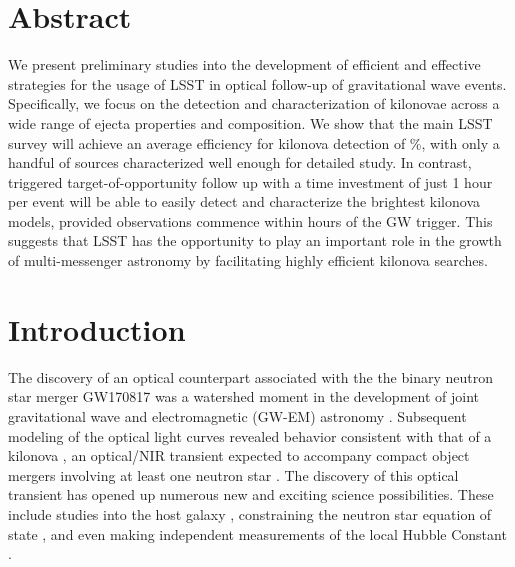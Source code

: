 \section*{Abstract}
We present preliminary studies into the development of efficient and effective strategies for the usage of LSST in optical follow-up of gravitational wave events. Specifically, we focus on the detection and characterization of kilonovae across a wide range of ejecta properties and composition. We show that the main LSST survey will achieve an average efficiency for kilonova detection of \%, with only a handful of sources characterized well enough for detailed study. In contrast, triggered target-of-opportunity follow up with a time investment of just 1 hour per event will be able to easily detect and characterize the brightest kilonova models, provided observations commence within  hours of the GW trigger. This suggests that LSST has the opportunity to play an important role in the growth of multi-messenger astronomy by facilitating highly efficient kilonova searches.

\clearpage
\section{Introduction}
\label{sec:ch6_intro}
The discovery of an optical counterpart associated with the the binary neutron star merger GW170817 was a watershed moment in the development of joint gravitational wave and electromagnetic (GW-EM) astronomy \citep{LIGOGW170817,LIGOMMAPaper,Arcavi+17,Coulter+17,GW170817DECam,Valenti+17}. Subsequent modeling of the optical light curves revealed behavior consistent with that of a kilonova \citep{Cowp+17,Kilpatrick+17,Tanaka+17,Villar+17b, Tanaka+18}, an optical/NIR transient expected to accompany compact object mergers involving at least one neutron star \citep[see e.g.,][]{Metzger2017}. The discovery of this optical transient has opened up numerous new and exciting science possibilities. These include studies into the host galaxy \citep[NGC4993, see e.g.,][]{Blanchard+17,Cantiello+18}, constraining the neutron star equation of state \citep[see e.g.,][]{Radice+18}, and even making independent measurements of the local Hubble Constant \citep[H$_0$, see e.g.,][]{LIGOH0,Guidorzi+17}.

